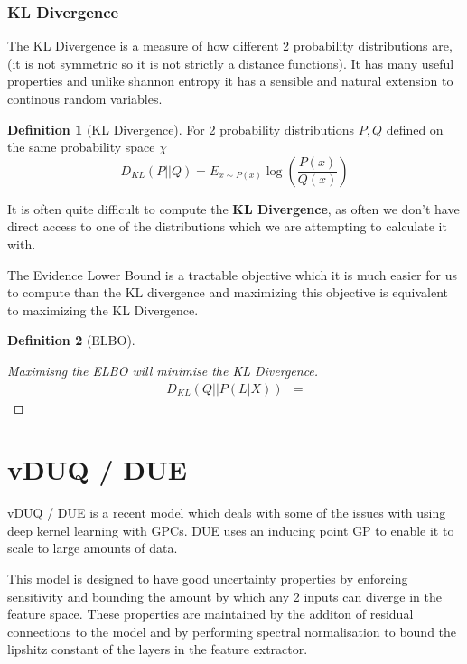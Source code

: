 \documentclass[12pt, a4paper]{report}
\theoremstyle{definition}
\theoremstyle{definition}
\newtheorem{definition}{Definition}[section]
\theoremstyle{definition}
\begin{document}
\subsection{KL Divergence}

The KL Divergence is a measure of how different 2 probability distributions are, (it is not symmetric so it is not strictly a distance functions). It has many useful properties and unlike shannon entropy it has a sensible and natural extension to continous random variables.

\begin{definition}[KL Divergence]
    For 2 probability distributions $P, Q$ defined on the same probability space $\chi$
    $$D_{KL} \left( P || Q \right) = E_{x \sim P(x)}  \log \left( \frac{P(x)}{Q(x)}\right)$$
\end{definition}



It is often quite difficult to compute the \textbf{KL Divergence}, as often we don't have direct access to one of the distributions which we are attempting to calculate it with.

The Evidence Lower Bound is a tractable objective which it is much easier for us to compute than the KL divergence and maximizing this objective is equivalent to maximizing the KL Divergence.

\begin{definition}[ELBO]
    
\end{definition}


\begin{proof}[Maximisng the ELBO will minimise the KL Divergence]
    \begin{align*}
        D_{KL} \left( Q || P \left(L | X\right) \right) &= 
    \end{align*}
\end{proof}


\chapter{vDUQ / DUE}

vDUQ / DUE \cite{vanamersfoort2020uncertainty} is a recent model which deals with some of the issues with using deep kernel learning with GPCs. DUE uses an inducing point GP to enable it to scale to large amounts of data.

This model is designed to have good uncertainty properties by enforcing sensitivity and bounding the amount by which any 2 inputs can diverge in the feature space. These properties are maintained by the additon of residual connections to the model and by performing spectral normalisation to bound the lipshitz constant of the layers in the feature extractor.
\end{document}
